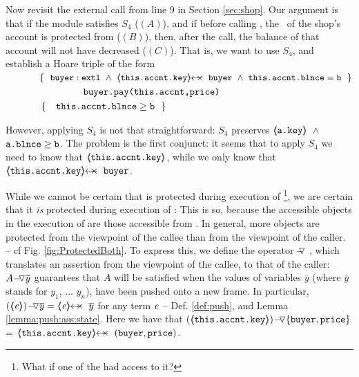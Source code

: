  Now  revisit the external call from line 9 in Section \ref{sec:shop}. Our argument is that if the module satisfies $S_4$ (\ie $(A)$), and if before calling , the \password\ of the shop's account is protected from  (\ie $(B)$), then, after the call, the balance of that account will not have decreased (\ie $(C)$). 
 That is, we want to use $S_4$, and   establish   a Hoare triple of the form
 \\
$\strut \ \ \ \ \ \ \ \ \ \ \  \{\  \ { \external{\prg{buyer}}} \ \wedge\ {\protectedFrom {\prg{this.\myAccount.key}} {\prg{buyer}}\ \wedge\ {\prg{this.\myAccount.\balance}}=\prg{b}    }\ \  \}$\\
$\strut \ \ \ \ \ \ \ \ \ \ \   \ \ \ \ \ \ \ \ \ \ \ \ {\ \prg{buyer.pay(this.accnt,price)}   \ } $\\
$\strut \ \ \ \ \ \ \ \ \ \ \  \{\  \ \  {\prg{this.\myAccount.\balance}} \geq  \prg{b} \  \  \}$ 

However, applying $S_4$ is not that straightforward: $S_4$ preserves   
${\inside {\prg{a.key}}}$\ $\wedge$\ $\prg{a.\balance}\geq\prg{b}$.
%
The problem is the first conjunct: it seems that to apply $S_4$ we need to know that ${\inside {\prg{this.\myAccount.key}}}$, while
we only know that $\protectedFrom {\prg{this.\myAccount.key}} {\prg{buyer}}$.%

 {While we cannot be certain that  
 {is  protected during execution of \footnote{{What if one of the  had access to it?}}, we are certain that it  \emph{is} protected during execution} of : 
This is so, because the   accessible objects in the execution of  are those accessible from .
{In general, more objects are protected from the viewpoint of the callee than from the viewpoint of the caller. -- cf Fig.  \ref{fig:ProtectedBoth}.
To express this,} we define the operator $\pushSymbolAA$ , which   translates an assertion from the viewpoint of the callee, to that of the caller:
 $\PushAS y A$   guarantees that $A$ will be satisfied when the values of variables $\overline y$ (where $\overline y$ stands for $y_1$, ... $y_n$),  have been pushed onto a new frame. 
 In particular,   $\PushAS y {(\inside \re)} =  \protectedFrom \re {\overline {y} }$ for any term  $\re$ -- \cf 
 Def. \ref{def:push},  and Lemma \ref{lemma:push:ass:state}.
Here we have that 
 $\PushASLong {\{\prg{buyer},\prg{price}\}}  {(\inside {\prg{this.\myAccount.key}})}$
 =  $\protectedFrom {\prg{this.\myAccount.key}} {(\prg{buyer},\prg{price})}$.}


